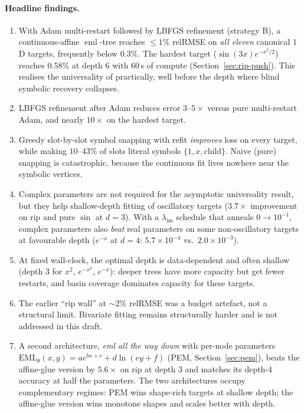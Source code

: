 \documentclass[11pt]{article}
\newcommand{\eml}{\operatorname{eml}}
\begin{document}
\paragraph{Headline findings.}
\begin{enumerate}
\item With Adam multi-restart followed by LBFGS refinement (strategy B), a
  continuous-affine $\eml$-tree reaches $\leq 1\%$ relRMSE on \emph{all
  eleven} canonical $1$D targets, frequently below $0.3\%$. The
  hardest target ($\sin(3x) e^{-x^2/2}$) reaches $0.58\%$ at depth $6$
  with $60\,$s of compute (Section~\ref{sec:rip-push}). This realises the
  universality of \cite{odrzywolek2026} practically, well before the depth
  where blind symbolic recovery collapses.
\item LBFGS refinement after Adam reduces error $3$--$5\times$ versus pure
  multi-restart Adam, and nearly $10\times$ on the hardest target.
\item Greedy slot-by-slot symbol snapping with refit \emph{improves} loss
  on every target, while making $10$--$43\%$ of slots literal symbols
  $\{1, x, \text{child}\}$. Naive (pure) snapping is catastrophic, because the
  continuous fit lives nowhere near the symbolic vertices.
\item Complex parameters are not required for the asymptotic universality
  result, but they help shallow-depth fitting of oscillatory targets
  ($3.7\times$ improvement on rip and pure $\sin$ at $d{=}3$). With a
  $\lambda_{\mathrm{im}}$ schedule that anneals $0 \to 10^{-1}$, complex
  parameters also \emph{beat} real parameters on some non-oscillatory
  targets at favourable depth ($e^{-x}$ at $d{=}4$: $5.7 \times 10^{-4}$
  vs.\ $2.0 \times 10^{-3}$).
\item At fixed wall-clock, the optimal depth is data-dependent and often
  shallow (depth $3$ for $x^2$, $e^{-x^2}$, $e^{-x}$): deeper trees have more
  capacity but get fewer restarts, and basin coverage dominates capacity
  for these targets.
\item The earlier ``rip wall'' at $\sim 2\%$ relRMSE was a budget artefact,
  not a structural limit. Bivariate fitting remains structurally harder
  and is not addressed in this draft.
\item A second architecture, \emph{eml all the way down} with per-node
  parameters $\mathrm{EML}_\theta(x,y) = a e^{bx+c} + d \ln(ey+f)$ (PEM,
  Section~\ref{sec:pem}), beats the affine-glue version by $5.6\times$ on
  rip at depth $3$ and matches its depth-$4$ accuracy at half the
  parameters. The two architectures occupy complementary regimes: PEM wins
  shape-rich targets at shallow depth; the affine-glue version wins
  monotone shapes and scales better with depth.
\end{enumerate}
\end{document}
